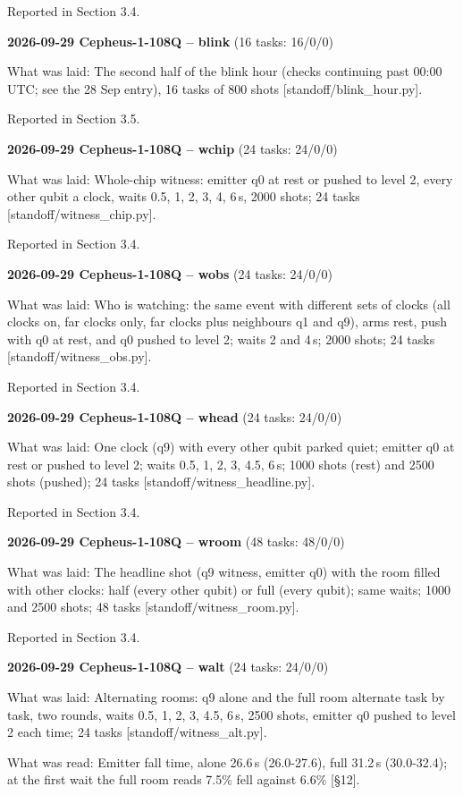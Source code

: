 \documentclass[11pt]{article}
\begin{document}
Reported in Section 3.4.

\textbf{2026-09-29 Cepheus-1-108Q -- blink} (16 tasks: 16/0/0)

What was laid: The second half of the blink hour (checks continuing past 00:00 UTC; see the 28 Sep entry), 16 tasks of 800 shots {[}standoff/blink\_hour.py{]}.

Reported in Section 3.5.

\textbf{2026-09-29 Cepheus-1-108Q -- wchip} (24 tasks: 24/0/0)

What was laid: Whole-chip witness: emitter q0 at rest or pushed to level 2, every other qubit a clock, waits 0.5, 1, 2, 3, 4, 6\,\textmu s, 2000 shots; 24 tasks {[}standoff/witness\_chip.py{]}.

Reported in Section 3.4.

\textbf{2026-09-29 Cepheus-1-108Q -- wobs} (24 tasks: 24/0/0)

What was laid: Who is watching: the same event with different sets of clocks (all clocks on, far clocks only, far clocks plus neighbours q1 and q9), arms rest, push with q0 at rest, and q0 pushed to level 2; waits 2 and 4\,\textmu s; 2000 shots; 24 tasks {[}standoff/witness\_obs.py{]}.

Reported in Section 3.4.

\textbf{2026-09-29 Cepheus-1-108Q -- whead} (24 tasks: 24/0/0)

What was laid: One clock (q9) with every other qubit parked quiet; emitter q0 at rest or pushed to level 2; waits 0.5, 1, 2, 3, 4.5, 6\,\textmu s; 1000 shots (rest) and 2500 shots (pushed); 24 tasks {[}standoff/witness\_headline.py{]}.

Reported in Section 3.4.

\textbf{2026-09-29 Cepheus-1-108Q -- wroom} (48 tasks: 48/0/0)

What was laid: The headline shot (q9 witness, emitter q0) with the room filled with other clocks: half (every other qubit) or full (every qubit); same waits; 1000 and 2500 shots; 48 tasks {[}standoff/witness\_room.py{]}.

Reported in Section 3.4.

\textbf{2026-09-29 Cepheus-1-108Q -- walt} (24 tasks: 24/0/0)

What was laid: Alternating rooms: q9 alone and the full room alternate task by task, two rounds, waits 0.5, 1, 2, 3, 4.5, 6\,\textmu s, 2500 shots, emitter q0 pushed to level 2 each time; 24 tasks {[}standoff/witness\_alt.py{]}.

What was read: Emitter fall time, alone 26.6\,\textmu s (26.0-27.6), full 31.2\,\textmu s (30.0-32.4); at the first wait the full room reads 7.5\% fell against 6.6\% {[}\S{}12{]}.
\end{document}
